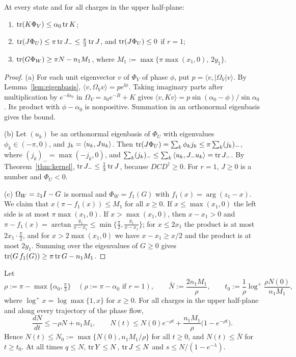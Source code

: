 \begin{lemma}\label{lem:three}
At every state and for all charges in the upper half-plane:
\begin{enumerate}
\item[(a)] $\operatorname{tr}(K\Phi_V)\leq\alpha_0\operatorname{tr} K$;
\item[(b)] $\operatorname{tr}(J\Phi_U)\leq\pi\operatorname{tr} J_-\leq\frac\pi3\operatorname{tr} J$, and
 $\operatorname{tr}(J\Phi_U)\leq0$ if $r=1$;
\item[(c)] $\operatorname{tr}(G\Phi_W)\geq\pi N-n_1M_1$, where
 $M_1:=\max\{\pi\max(x_1,0),\,2y_1\}$.
\end{enumerate}
\end{lemma}

\begin{proof}
(a) For each unit eigenvector $v$ of $\Phi_V$ of phase $\phi$, put
$p=\langle v,|\Omega_V|v\rangle$. By Lemma~\ref{lem:eigenbasis},
$\langle v,\Omega_Vv\rangle=pe^{\ii\phi}$. Taking imaginary parts after
multiplication by $e^{-\ii\alpha_0}$ in $\Omega_V=z_0e^{-B}+K$ gives
$\langle v,Kv\rangle=p\sin(\alpha_0-\phi)/\sin\alpha_0$.
Its product with $\phi-\alpha_0$ is nonpositive. Summation in an
orthonormal eigenbasis gives the bound.

(b) Let $(u_k)$ be an orthonormal eigenbasis of $\Phi_U$ with eigenvalues
$\phi_k\in(-\pi,0)$, and $j_k=\left\langle u_k,Ju_k\right\rangle$. Then
$\operatorname{tr}(J\Phi_U)=\sum_k\phi_kj_k\leq\pi\sum_k(j_k)_-$, where
$(j_k)_-=\max(-j_k,0)$, and
$\sum_k(j_k)_-\leq\sum_k\left\langle u_k,J_-u_k\right\rangle=\operatorname{tr} J_-$. By
Theorem~\ref{thm:kernel}, $\operatorname{tr} J_-\leq\frac13\operatorname{tr} J$, because
$DCD^\dagger\geq0$. For $r=1$, $J\geq0$ is a number and $\Phi_U<0$.

(c) $\Omega_W=z_1I-G$ is normal and $\Phi_W=f_1(G)$ with
$f_1(x)=\arg(z_1-x)$. We claim that $x(\pi-f_1(x))\leq M_1$ for all
$x\geq0$. If $x\leq\max(x_1,0)$ the left side is at most $\pi\max(x_1,0)$.
If $x>\max(x_1,0)$, then $x-x_1>0$ and
$\pi-f_1(x)=\arctan\frac{y_1}{x-x_1}\leq\min\{\frac\pi2,\frac{y_1}{x-x_1}\}$;
for $x\leq2x_1$ the product is at most $2x_1\cdot\frac\pi2$, and for
$x>2\max(x_1,0)$ we have $x-x_1\geq x/2$ and the product is at most $2y_1$.
Summing over the eigenvalues of $G\geq0$ gives
$\operatorname{tr}(G\,f_1(G))\geq\pi\operatorname{tr} G-n_1M_1$.
\end{proof}

\begin{theorem}\label{thm:energy}
Let
\[
 \rho:=\pi-\max\bigl\{\alpha_0,\tfrac\pi3\bigr\}\quad
 (\rho:=\pi-\alpha_0\text{ if }r=1),\qquad
 \bar N:=\frac{2n_1M_1}\rho,\qquad
 t_0:=\frac1\rho\log^+\frac{\rho N(0)}{n_1M_1},
\]
where $\log^+x=\log\max\{1,x\}$ for $x\geq0$.
For all charges in the upper half-plane and along every trajectory of the
phase flow,
\[
 \frac{dN}{dt}\leq-\rho N+n_1M_1,\qquad
 N(t)\leq N(0)e^{-\rho t}+\frac{n_1M_1}\rho\bigl(1-e^{-\rho t}\bigr).
\]
Hence $N(t)\leq N_0:=\max\{N(0),n_1M_1/\rho\}$ for all $t\geq0$, and
$N(t)\leq\bar N$ for $t\geq t_0$. At all times $q\leq N$, $\operatorname{tr} Y\leq N$,
$\operatorname{tr} J\leq N$ and $s\leq N/(1-e^{-\lambda})$.
\end{theorem}

